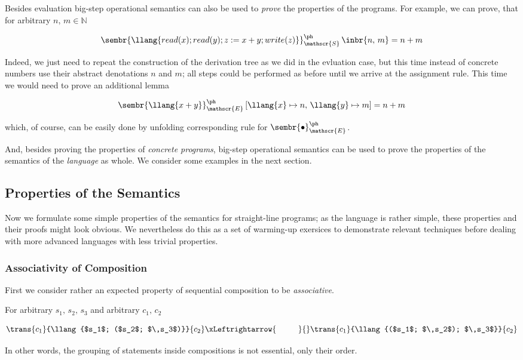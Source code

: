 \FloatBarrier

Besides evaluation big-step operational semantics can also be used to \emph{prove} the properties of the programs. For example, we can prove, that for
arbitrary $n,\, m\in\mathbb{N}$

\[
\sembr{\llang{read (x); read (y); z := x + y; write (z)}}^\ph_\mathscr{S}\,\inbr{n,\,m}=n+m
\]

Indeed, we just need to repeat the construction of the derivation tree as we did in the evluation case, but this time instead of concrete numbers use
their abstract denotations $n$ and $m$; all steps could be performed as before until we arrive at the assignment rule. This time we would need to prove
an additional lemma

\[
\sembr{\llang{x + y}}^\ph_\mathscr{E}\,[\llang{x}\mapsto n,\,\llang{y}\mapsto m]=n+m
\]

which, of course, can be easily done by unfolding corresponding rule for $\sembr{\bullet}^\ph_\mathscr{E}$.

And, besides proving the properties of \emph{concrete programs}, big-step operational semantics can be used to prove the properties
of the semantics of the \emph{language} as whole. We consider some examples in the next section.

\subsection{Properties of the Semantics}

Now we formulate some simple properties of the semantics for straight-line programs; as the language is rather simple, these
properties and their proofs might look obvious. We nevertheless do this as a set of warming-up exersices to demonstrate
relevant techniques before dealing with more advanced languages with less trivial properties.

\subsubsection{Associativity of Composition}

First we consider rather an expected property of sequential composition to be \emph{associative}.

\begin{lemma} For arbitrary $s_1,\,s_2,\,s_3$ and arbitrary $c_1,\,c_2$

\[
\trans{c_1}{\llang{$s_1$; ($s_2$; $\,s_3$)}}{c_2}\xLeftrightarrow{\phantom{XXX}}{}\trans{c_1}{\llang{($s_1$; $\,s_2$); $\,s_3$}}{c_2}
\]


In other words, the grouping of statements inside compositions is not essential, only their order.
\end{lemma}

